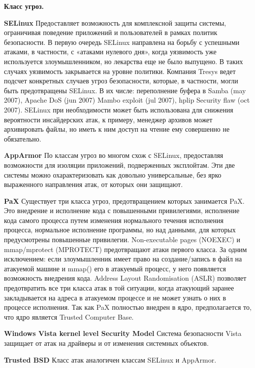 {\bfseries Класс угроз.}

\bigskip

{\bfseries SELinux} 
Предоставляет возможность для комплексной 
защиты системы, ограничивая поведение 
приложений и пользователей в рамках политик 
безопасности. В первую очередь SELinux 
направлена на борьбу с успешными атаками, 
в частности, с «атаками нулевого дня», когда 
уязвимость уже используется злоумышленником, 
но лекарства еще не было выпущено. В таких 
случаях уязвимость закрывается на уровне 
политики. Компания Tresys ведет подсчет 
конкретных случаев угроз безопасности, которые, 
в частности, могли быть предотвращены SELinux. 
В их числе: переполнение буфера в Samba (may 
2007), Apache DoS (jun 2007) Mambo exploit (jul 
2007), hplip Security flaw (oct 2007). SELinux 
при необходимости может быть использована для 
снижения вероятности инсайдерских атак, к примеру, 
менеджер архивов может архивировать файлы, но иметь 
к ним доступ на чтение ему совершенно не обязательно. 

\bigskip
{\bfseries AppArmor}
По классам угроз во многом схож с SELinux, 
предоставляя возможности для изоляции приложений, 
подверженных эксплойтам. Эти две системы можно 
охарактеризовать как довольно универсальные, 
без ярко выраженного направления атак, от которых 
они защищают.

\bigskip
{\bfseries PaX } 
Существует три класса угроз, предотвращением которых 
занимается PaX. Это внедрение и исполнение кода с 
повышенными привилегиями, исполнение кода самого 
процесса путем изменения нормального течения 
исполнения процесса, нормальное исполнение программы, 
но над данными, для которых предусмотрены повышенные 
привилегии. Non-executable pages (NOEXEC) и mmap/mprotect 
(MPROTECT) предотвращают атаки первого класса. За одним 
исключением: если злоумышленник имеет право на 
создание/запись в файл на атакуемой машине и mmap() 
его в атакуемый процесс, у него появляется возможность 
внедрения кода. Address Layout Randomisation (ASLR) 
позволяет предотвратить все три класса атак в той 
ситуации, когда атакующий заранее закладывается на 
адреса в атакуемом процессе и не может узнать о них 
в процессе исполнения. Так как PaX полностью внедрен 
в ядро, предполагается то, что ядро является Trusted 
Computer Base. 

\bigskip
{\bfseries Windows Vista kernel level Security Model }
Система безопасности Vista защищает от атак на 
драйверы и от изменения системных объектов. 

\bigskip
{\bfseries Trusted BSD} 
Класс атак аналогичен классам SELinux и AppArmor. 

